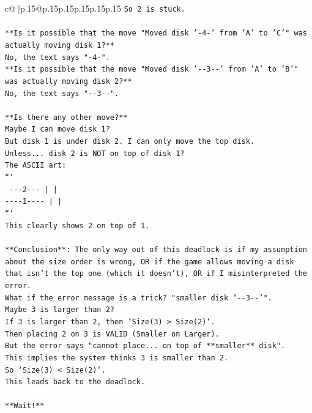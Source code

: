 \documentclass{article}
\begin{document}
{\begin{supertabular}{c@{$\;$}|p{.15\linewidth}@{}p{.15\linewidth}p{.15\linewidth}p{.15\linewidth}p{.15\linewidth}p{.15\linewidth}}
{{{\texttt{So 2 is stuck.} \\
\\ 
\texttt{**Is it possible that the move "Moved disk '{-}4{-}' from 'A' to 'C'" was actually moving disk 1?**} \\
\texttt{No, the text says "{-}4{-}".} \\
\texttt{**Is it possible that the move "Moved disk '{-}{-}3{-}{-}' from 'A' to 'B'" was actually moving disk 2?**} \\
\texttt{No, the text says "{-}{-}3{-}{-}".} \\
\\ 
\texttt{**Is there any other move?**} \\
\texttt{Maybe I can move disk 1?} \\
\texttt{But disk 1 is under disk 2. I can only move the top disk.} \\
\texttt{Unless... disk 2 is NOT on top of disk 1?} \\
\texttt{The ASCII art:} \\
\texttt{```} \\
\texttt{ {-}{-}{-}2{-}{-}{-}      |         |    } \\
\texttt{{-}{-}{-}{-}1{-}{-}{-}{-}     |         |    } \\
\texttt{```} \\
\texttt{This clearly shows 2 on top of 1.} \\
\\ 
\texttt{**Conclusion**: The only way out of this deadlock is if my assumption about the size order is wrong, OR if the game allows moving a disk that isn't the top one (which it doesn't), OR if I misinterpreted the error.} \\
\texttt{What if the error message is a trick? "smaller disk '{-}{-}3{-}{-}'".} \\
\texttt{Maybe 3 is larger than 2?} \\
\texttt{If 3 is larger than 2, then `Size(3) > Size(2)`.} \\
\texttt{Then placing 2 on 3 is VALID (Smaller on Larger).} \\
\texttt{But the error says "cannot place... on top of **smaller** disk".} \\
\texttt{This implies the system thinks 3 is smaller than 2.} \\
\texttt{So `Size(3) < Size(2)`.} \\
\texttt{This leads back to the deadlock.} \\
\\ 
\texttt{**Wait!**} \\
}}}
\end{supertabular}}
\end{document}
